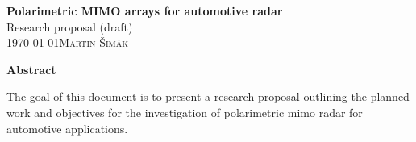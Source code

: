 \begin{center}
    {\Large\bfseries Polarimetric MIMO arrays for automotive radar}\\[2ex]
    {\large Research proposal (draft)}\\[4ex]
    {\normalsize\scshape \today \hfill Martin Šimák}\\
    \noindent\hrulefill
\end{center}
\vspace{2ex}
\begin{center}
    {\bfseries Abstract}\\[2ex]
\end{center}
{
    \noindent\small The goal of this document is to present a research proposal outlining the planned work and objectives for the investigation of polarimetric \gls{mimo} radar for automotive applications.
}
\newpage
\setcounter{tocdepth}{2}
\tableofcontents